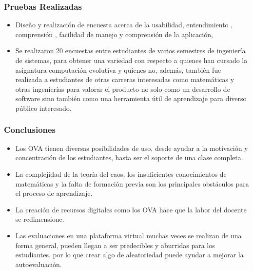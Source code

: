 \documentclass{beamer}
\begin{document}
\begin{frame} [label=PRUEBA]
  \frametitle{Pruebas Realizadas}
\begin{itemize}
  \item <1> Diseño y realización de encuesta acerca de la usabilidad, entendimiento , comprensión , facilidad de manejo y comprensión de la aplicación,
  \item <2> Se realizaron 20 encuestas entre estudiantes de varios semestres de ingeniería de sistemas, para obtener una variedad con respecto a quienes han cursado la asignatura computación evolutiva y quienes no, además, también fue realizada a estudiantes de otras carreras interesadas como matemáticas y otras ingenierías para valorar el producto no solo como un desarrollo de software sino también como una herramienta útil de aprendizaje para diverso público interesado.
\end{itemize}
  
\end{frame}

\begin{frame}
\frametitle{Conclusiones}
\begin{itemize}
  \item <1>Los OVA tienen diversas posibilidades de uso, desde ayudar a la motivación y concentración de los estudiantes, hasta ser el soporte de una clase completa.
  \item <2>La complejidad de la teoría del caos, los insuficientes conocimientos de matemáticas y la falta de formación previa son los principales obstáculos para el proceso de aprendizaje.
  \item <3>La creación de recursos digitales como los OVA hace que la labor del docente se redimensione.
  \item <4>Las evaluaciones en una plataforma virtual muchas veces se realizan de una forma general, pueden llegan a ser predecibles y aburridas para los estudiantes, por lo que crear algo de aleatoriedad puede ayudar a mejorar la autoevaluación.  
\end{itemize} 
\end{frame}
\end{document}
